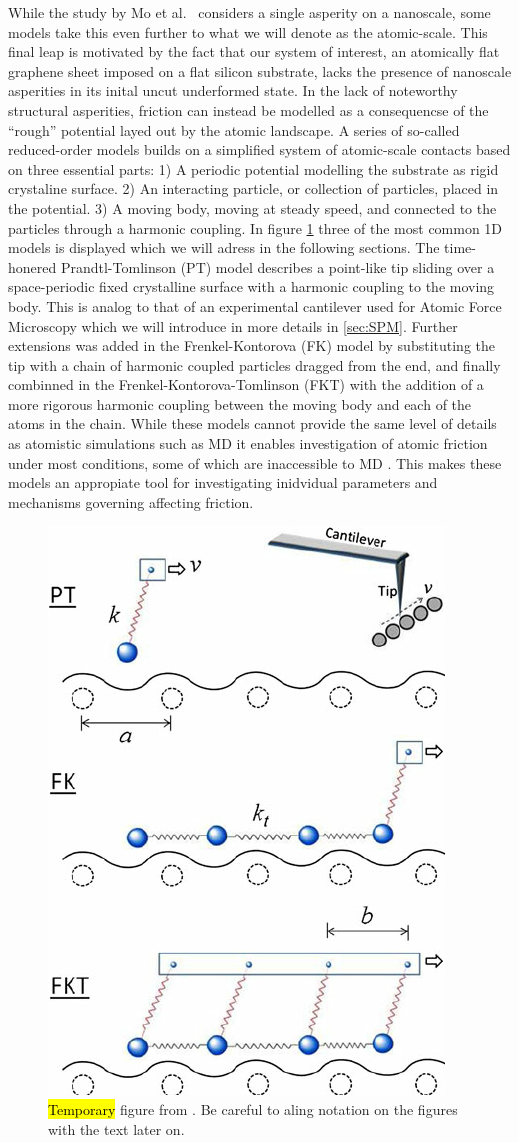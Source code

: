 While the study by Mo et al.\ \cite{mo_friction_2009} considers a single
asperity on a nanoscale, some models take this even further to what we will
denote as the atomic-scale. This final leap is motivated by the fact that our
system of interest, an atomically flat graphene sheet imposed on a flat silicon
substrate, lacks the presence of nanoscale asperities in its inital uncut
underformed state. In the lack of noteworthy structural asperities, friction can
instead be modelled as a consequencse of the ``rough'' potential layed out by
the atomic landscape. A series of so-called reduced-order models builds on a
simplified system of atomic-scale contacts based on three essential parts: 1) A
periodic potential modelling the substrate as rigid crystaline surface. 2) An
interacting particle, or collection of particles, placed in the potential. 3) A
moving body, moving at steady speed, and connected to the particles through a
harmonic coupling. In figure \cref{fig:PT_FK_FKT} three of the most common 1D
models is displayed which we will adress in the following sections. The
time-honered Prandtl-Tomlinson (PT) model describes a point-like tip sliding
over a space-periodic fixed crystalline surface with a harmonic coupling to the
moving body. This is analog to that of an experimental cantilever used for
Atomic Force Microscopy which we will introduce in more details in
\cref{sec:SPM}. Further extensions was added in the Frenkel-Kontorova
(\acrshort{FK}) model by substituting the tip with a chain of harmonic coupled
particles dragged from the end, and finally combinned in the
Frenkel-Kontorova-Tomlinson (\acrshort{FKT}) with the addition of a more
rigorous harmonic coupling between the moving body and each of the atoms in the
chain. While these models cannot provide the same level of details as atomistic
simulations such as \acrshort{MD} it enables investigation of atomic friction
under most conditions, some of which are inaccessible to \acrshort{MD}
\cite{Yalin_2011}. This makes these models an appropiate tool for investigating
inidvidual parameters and mechanisms governing affecting friction.


\begin{figure}[H]
  \centering
  \includegraphics[width=0.4\linewidth]{figures/theory/PT_FK_FKT.png}
  \caption{\hl{Temporary} figure from \cite{Yalin_2011}. Be careful to aling notation on the figures with the text later on.}
  \label{fig:PT_FK_FKT}
\end{figure}



